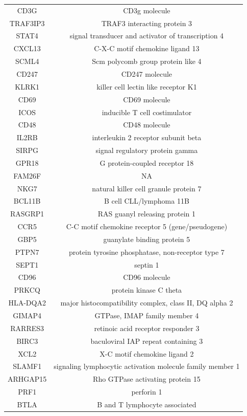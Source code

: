 \documentclass[12pt,]{book}
\theoremstyle{definition}
\theoremstyle{definition}
\theoremstyle{definition}
\theoremstyle{remark}
\begin{document}
\begin{longtable}[t]{cc}
CD3G & CD3g molecule\\
TRAF3IP3 & TRAF3 interacting protein 3\\
STAT4 & signal transducer and activator of transcription 4\\
\addlinespace
CXCL13 & C-X-C motif chemokine ligand 13\\
SCML4 & Scm polycomb group protein like 4\\
CD247 & CD247 molecule\\
KLRK1 & killer cell lectin like receptor K1\\
CD69 & CD69 molecule\\
\addlinespace
ICOS & inducible T cell costimulator\\
CD48 & CD48 molecule\\
IL2RB & interleukin 2 receptor subunit beta\\
SIRPG & signal regulatory protein gamma\\
GPR18 & G protein-coupled receptor 18\\
\addlinespace
FAM26F & NA\\
NKG7 & natural killer cell granule protein 7\\
BCL11B & B cell CLL/lymphoma 11B\\
RASGRP1 & RAS guanyl releasing protein 1\\
CCR5 & C-C motif chemokine receptor 5 (gene/pseudogene)\\
\addlinespace
GBP5 & guanylate binding protein 5\\
PTPN7 & protein tyrosine phosphatase, non-receptor type 7\\
SEPT1 & septin 1\\
CD96 & CD96 molecule\\
PRKCQ & protein kinase C theta\\
\addlinespace
HLA-DQA2 & major histocompatibility complex, class II, DQ alpha 2\\
GIMAP4 & GTPase, IMAP family member 4\\
RARRES3 & retinoic acid receptor responder 3\\
BIRC3 & baculoviral IAP repeat containing 3\\
XCL2 & X-C motif chemokine ligand 2\\
\addlinespace
SLAMF1 & signaling lymphocytic activation molecule family member 1\\
ARHGAP15 & Rho GTPase activating protein 15\\
PRF1 & perforin 1\\
BTLA & B and T lymphocyte associated\\

\end{longtable}
\end{document}
